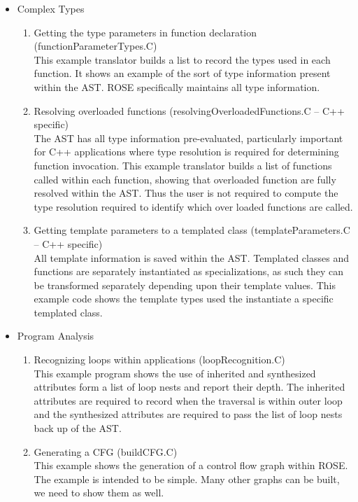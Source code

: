 \begin{itemize}
\begin{enumerate}
  \end{enumerate}

  \item{Complex Types} 
        \begin{enumerate}
     \item Getting the type parameters in function declaration (functionParameterTypes.C) \\
           This example translator builds a list to record the types used in each
           function.  It shows an example of the sort of type information present 
           within the AST.  ROSE specifically maintains all type information.

     \item Resolving overloaded functions (resolvingOverloadedFunctions.C -- C++ specific) \\
           The AST has all type information pre-evaluated, particularly important for C++
           applications where type resolution is required for determining function
           invocation. This example translator builds a list of functions called within
           each function, showing that overloaded function are fully resolved within the
           AST.  Thus the user is not required to compute the type resolution required
           to identify which over loaded functions are called.

     \item Getting template parameters to a templated class (templateParameters.C -- C++ specific) \\
           All template information is saved within the AST.  Templated classes and
           functions are separately instantiated as specializations, as such they
           can be transformed separately depending upon their template values.
           This example code shows the template types used the instantiate a specific
           templated class.

        \end{enumerate}

  \item{Program Analysis} 
        \begin{enumerate}
     \item Recognizing loops within applications (loopRecognition.C) \\
           This example program shows the use of inherited and synthesized attributes
           form a list of loop nests and report their depth.  The inherited attributes are
           required to record when the traversal is within outer loop and the synthesized 
           attributes are required to pass the list of loop nests back up of the AST.
     \item Generating a CFG (buildCFG.C) \\
           This example shows the generation of a control flow graph 
           within ROSE.  The example is intended to be simple.  Many other
           graphs can be built, we need to show them as well.


\end{enumerate}
\end{itemize}
